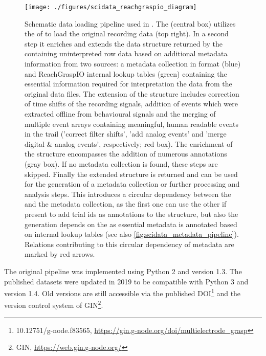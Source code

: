\begin{figure}
 \texttt{[image: ./figures/scidata\_reachgraspio\_diagram]}
 \caption[Schematic data loading pipeline used in \citet{Brochier_2018}]{Schematic data loading pipeline used in \citet{Brochier_2018}. The  (central box) utilizes the  of  to load the original recording data (top right). In a second step it enriches and extends the data structure returned by the  containing uninterpreted row data based on additional metadata information from two sources: a metadata collection in  format (blue) and ReachGraspIO internal lookup tables (green) containing the essential information required for interpretation the data from the original data files. The extension of the  structure includes correction of time shifts of the recording signals, addition of events which were extracted offline from behavioural signals and the merging of multiple event arrays containing meaningful, human readable events in the trail ('correct filter shifts', 'add analog events' and 'merge digital \& analog events', respectively; red box). The enrichment of the  structure encompasses the addition of numerous annotations (gray box). If no metadata collection is found, these steps are skipped. Finally the extended  structure is returned and can be used for the generation of a metadata collection or further processing and analysis steps. This introduces a circular dependency between the  and the metadata collection, as the first one can use the other if present to add trial ids as annotations to the  structure, but also the  generation depends on the  as essential metadata is annotated based on internal lookup tables (see also \cref{fig:scidata_metadata_pipeline}). Relations contributing to this circular dependency of metadata are marked by red arrows.}
 \label{fig:scidata_reachgraspio_diagram}
\end{figure}




The original pipeline was implemented using Python 2 and  version 1.3. The published datasets were updated in 2019 to be compatible with Python 3 and  version 1.4. Old versions are still accessible via the published DOI\footnote{10.12751/g-node.f83565, \url{https://gin.g-node.org/doi/multielectrode_grasp}} and the version control system of GIN\footnote{GIN, \url{https://web.gin.g-node.org/}}.


